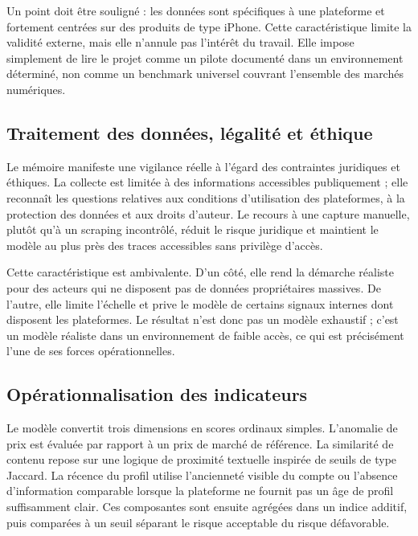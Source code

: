 \documentclass[10pt,a4paper]{article}
\begin{document}
Un point doit être souligné : les données sont spécifiques à une plateforme et fortement centrées sur des produits de type iPhone. Cette caractéristique limite la validité externe, mais elle n'annule pas l'intérêt du travail. Elle impose simplement de lire le projet comme un pilote documenté dans un environnement déterminé, non comme un benchmark universel couvrant l'ensemble des marchés numériques.

\subsection{Traitement des données, légalité et éthique}
Le mémoire manifeste une vigilance réelle à l'égard des contraintes juridiques et éthiques. La collecte est limitée à des informations accessibles publiquement ; elle reconnaît les questions relatives aux conditions d'utilisation des plateformes, à la protection des données et aux droits d'auteur. Le recours à une capture manuelle, plutôt qu'à un scraping incontrôlé, réduit le risque juridique et maintient le modèle au plus près des traces accessibles sans privilège d'accès.

Cette caractéristique est ambivalente. D'un côté, elle rend la démarche réaliste pour des acteurs qui ne disposent pas de données propriétaires massives. De l'autre, elle limite l'échelle et prive le modèle de certains signaux internes dont disposent les plateformes. Le résultat n'est donc pas un modèle exhaustif ; c'est un modèle réaliste dans un environnement de faible accès, ce qui est précisément l'une de ses forces opérationnelles.

\subsection{Opérationnalisation des indicateurs}
Le modèle convertit trois dimensions en scores ordinaux simples. L'anomalie de prix est évaluée par rapport à un prix de marché de référence. La similarité de contenu repose sur une logique de proximité textuelle inspirée de seuils de type Jaccard. La récence du profil utilise l'ancienneté visible du compte ou l'absence d'information comparable lorsque la plateforme ne fournit pas un âge de profil suffisamment clair. Ces composantes sont ensuite agrégées dans un indice additif, puis comparées à un seuil séparant le risque acceptable du risque défavorable.
\end{document}

